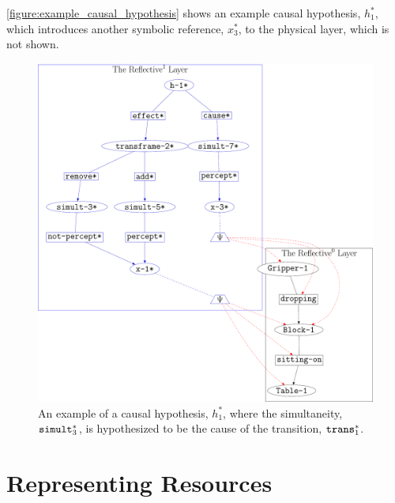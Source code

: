{\mbox{\autoref{figure:example_causal_hypothesis}}} shows an example
causal hypothesis, $h_1^*$, which introduces another symbolic
reference, $x_3^*$, to the physical layer, which is not shown.
\begin{figure}
\center
\includegraphics[width=12cm]{gfx/example_causal_hypothesis}
\caption[An example of a causal hypothesis.]{An example of a causal
  hypothesis, $h_1^*$, where the simultaneity,
  $\text{\tt{simult}}_3^*$, is hypothesized to be the cause of the
  transition, $\text{\tt{trans}}_1^*$.}
\label{figure:example_causal_hypothesis}
\end{figure}

\section{Representing Resources}

